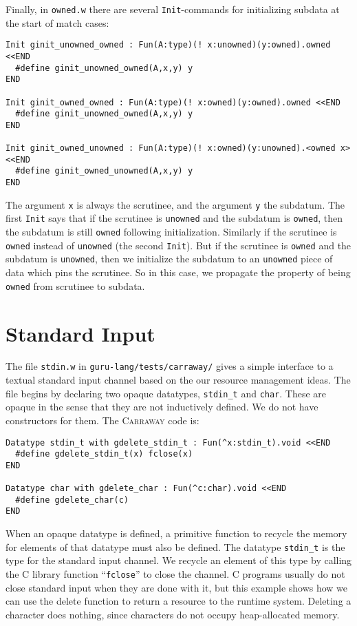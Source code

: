 \documentclass{book}[12pt]
\newcommand{\carraway}[0]{\textsc{Carraway}\xspace}
\begin{document}
Finally, in \texttt{owned.w} there are several \texttt{Init}-commands
for initializing subdata at the start of match cases:

{\small
\begin{verbatim}
Init ginit_unowned_owned : Fun(A:type)(! x:unowned)(y:owned).owned <<END
  #define ginit_unowned_owned(A,x,y) y
END

Init ginit_owned_owned : Fun(A:type)(! x:owned)(y:owned).owned <<END
  #define ginit_unowned_owned(A,x,y) y
END

Init ginit_owned_unowned : Fun(A:type)(! x:owned)(y:unowned).<owned x> <<END
  #define ginit_owned_unowned(A,x,y) y
END
\end{verbatim}
}

\noindent The argument \texttt{x} is always the scrutinee, and the
argument \texttt{y} the subdatum.  The first \texttt{Init} says that
if the scrutinee is \texttt{unowned} and the subdatum is
\texttt{owned}, then the subdatum is still \texttt{owned} following
initialization.  Similarly if the scrutinee is \texttt{owned} instead
of \texttt{unowned} (the second \texttt{Init}).  But if the scrutinee
is \texttt{owned} and the subdatum is \texttt{unowned}, then we
initialize the subdatum to an \texttt{unowned} piece of data which
pins the scrutinee.  So in this case, we propagate the property of
being \texttt{owned} from scrutinee to subdata.

\section{Standard Input}

The file \texttt{stdin.w} in \texttt{guru-lang/tests/carraway/} gives
a simple interface to a textual standard input channel based on the
our resource management ideas.  The file begins by declaring two
opaque datatypes, \texttt{stdin\_t} and \texttt{char}.  These are
opaque in the sense that they are not inductively defined.  We do not
have constructors for them.  The \carraway code is:

\begin{verbatim}
Datatype stdin_t with gdelete_stdin_t : Fun(^x:stdin_t).void <<END
  #define gdelete_stdin_t(x) fclose(x)
END

Datatype char with gdelete_char : Fun(^c:char).void <<END
  #define gdelete_char(c) 
END
\end{verbatim}

\noindent When an opaque datatype is defined, a primitive function to
recycle the memory for elements of that datatype must also be defined.
The datatype \texttt{stdin\_t} is the type for the standard input
channel.  We recycle an element of this type by calling the C library
function ``\texttt{fclose}'' to close the channel.  C programs usually
do not close standard input when they are done with it, but this
example shows how we can use the delete function to return a resource
to the runtime system.  Deleting a character does nothing, since
characters do not occupy heap-allocated memory.
\end{document}
